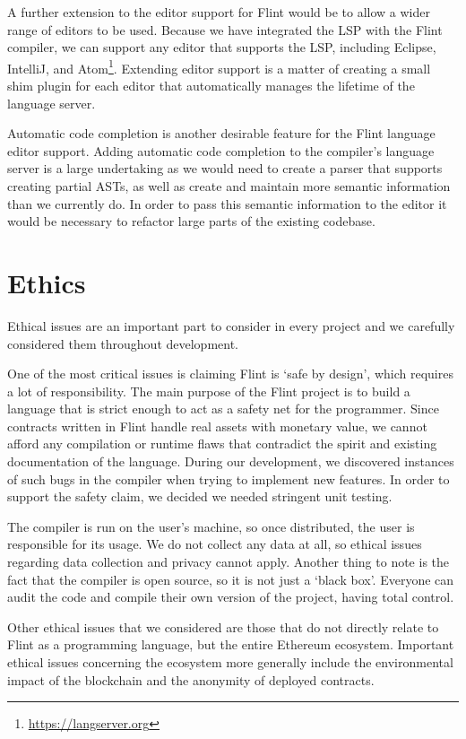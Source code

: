 A further extension to the editor support for Flint would be to allow a wider range of editors to be used. Because we have integrated the LSP with the Flint compiler, we can support any editor that supports the LSP, including Eclipse, IntelliJ, and Atom\footnote{\url{https://langserver.org}}. Extending editor support is a matter of creating a small shim plugin for each editor that automatically manages the lifetime of the language server.

Automatic code completion is another desirable feature for the Flint language editor support. Adding automatic code completion to the compiler's language server is a large undertaking as we would need to create a parser that supports creating partial ASTs, as well as create and maintain more semantic information than we currently do. In order to pass this semantic information to the editor it would be necessary to refactor large parts of the existing codebase.

\section{Ethics}

Ethical issues are an important part to consider in every project and we carefully considered them throughout development.

One of the most critical issues is claiming Flint is `safe by design', which requires a lot of responsibility. The main purpose of the Flint project is to build a language that is strict enough to act as a safety net for the programmer. Since contracts written in Flint handle real assets with monetary value, we cannot afford any compilation or runtime flaws that contradict the spirit and existing documentation of the language. During our development, we discovered instances of such bugs in the compiler when trying to implement new features. In order to support the safety claim, we decided we needed stringent unit testing.

The compiler is run on the user's machine, so once distributed, the user is responsible for its usage. We do not collect any data at all, so ethical issues regarding data collection and privacy cannot apply. Another thing to note is the fact that the compiler is open source, so it is not just a ‘black box’. Everyone can audit the code and compile their own version of the project, having total control.

Other ethical issues that we considered are those that do not directly relate to Flint as a programming language, but the entire Ethereum ecosystem. Important ethical issues concerning the ecosystem more generally include the environmental impact of the blockchain and the anonymity of deployed contracts.

